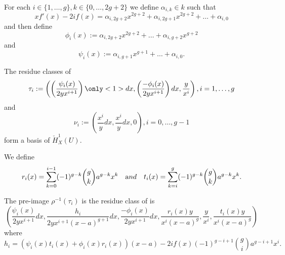 \documentclass{beamer}
\begin{document}
\begin{frame}
For each $i \in \{1, \ldots, g\}, k \in \{0, \ldots , 2g+2\}$ we define $\alpha_{i,k}\in k$ such that
\[
xf'(x) - 2if(x) = \alpha_{i,2g+2}x^{2g+2} + \alpha_{i, 2g+1}x^{2g+2} + \ldots + \alpha_{i,0}
\]
and then define
\[
\phi_i(x)  := \alpha_{i,2g+2}x^{2g+2} + \ldots + \alpha_{i,g+2}x^{g+2} 
\]
and
\[
\psi_i(x) := \alpha_{i,g+1}x^{g+1} + \ldots + \alpha_{i,0}.
\]
\pause
\begin{theorem}
The residue classes of
\[
\tau_i := \left( \left( \frac{\psi_i(x)}{2yx^{i+1}} \right) \only<1>{dx}, \left(\frac{-\phi_i(x)}{2yx^{i+1}} \right)dx, \frac{y}{x^i} \right), i= 1, \ldots, g
\]
and
\[
\nu_i := \left( \frac{x^i}{y}dx, \frac{x^i}{y}dx, 0 \right), i = 0, \ldots, g-1
\]
form a basis of $\check{H}^1_X(U)$.
\end{theorem}
\end{frame}

\begin{frame}
We define 
\[
r_i(x) = \sum_{k=0}^{i-1} (-1)^{g-k} \binom{g}{k} a^{g-k}x^k \quad {\text and} \quad t_i(x) = \sum_{k=i}^g (-1)^{g-k}\binom{g}{k} a^{g-k}x^k.
\]
\begin{theorem}
The pre-image $\rho^{-1}(\tau_i)$ is the residue class of is
\begin{equation*}
\left( \frac{\psi_i(x)}{2yx^{i+1}}dx, \frac{h_i}{2yx^{i+1}(x-a)^{g+1}}dx, \frac{-\phi_i(x)}{2yx^{i+1}}dx, \frac{r_i(x)y}{x^i(x-a)^g}, \frac{y}{x^i}, \frac{t_i(x)y}{x^i(x-a)^g} \right)
\end{equation*}
where
\[
h_i = 
(\psi_i(x)t_i(x) + \phi_i(x)r_i(x))(x-a) - 2if(x)(-1)^{g-i+1}\binom{g}{i}a^{g-i+1}x^i.
\]
\end{theorem}

\end{frame}
%
%
%
%
%
%
%
%
\end{document}

